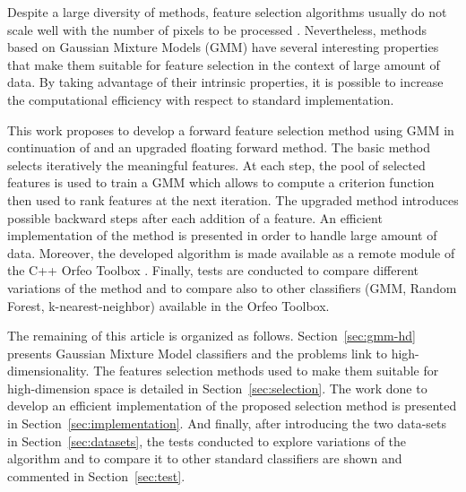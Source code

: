 \documentclass[journal]{IEEEtran}
\begin{document}
Despite a large diversity of methods, feature selection algorithms usually do not scale well with the number of pixels to be processed \cite{fauvel2015fast}. Nevertheless, methods based on Gaussian Mixture Models (GMM) have several interesting properties that make them suitable for feature selection in the context of large amount of data. By taking advantage of their intrinsic properties, it is possible to increase the computational efficiency with respect to standard implementation.


This work proposes to develop a forward feature selection method using GMM in continuation of \cite{fauvel2015fast} and an upgraded floating forward method. The basic method selects iteratively the meaningful features. At each step, the pool of selected features is used to train a GMM which allows to compute a criterion function then used to rank features at the next iteration. The upgraded method introduces possible backward steps after each addition of a feature. An efficient implementation of the method is presented in order to handle large amount of data. Moreover, the developed algorithm is made available as a remote module of the C++ Orfeo Toolbox \cite{christophe2008orfeo}. Finally, tests are conducted to compare different variations of the method and to compare also to other classifiers (GMM, Random Forest, k-nearest-neighbor) available in the Orfeo Toolbox.

The remaining of this article is organized as follows. Section~\ref{sec:gmm-hd} presents Gaussian Mixture Model classifiers and the problems link to high-dimensionality. The features selection methods used to make them suitable for high-dimension space is detailed in Section~\ref{sec:selection}. The work done to develop an efficient implementation of the proposed selection method is presented in Section~\ref{sec:implementation}. And finally, after introducing the two data-sets in Section~\ref{sec:datasets}, the tests conducted to explore variations of the algorithm and to compare it to other standard classifiers are shown and commented in Section~\ref{sec:test}.
\end{document}
